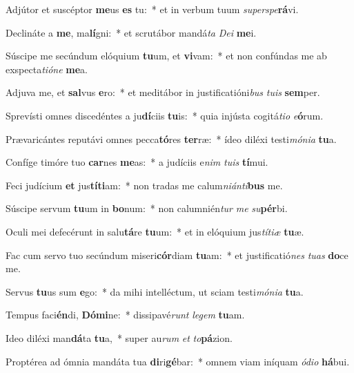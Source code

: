 \item Adjútor et suscéptor \textbf{me}us \textbf{es} tu:~* et in verbum tuum \textit{su}\textit{per}\textit{spe}\textbf{rá}vi.
\item Declináte a \textbf{me}, ma\textbf{lí}gni:~* et scrutábor mandá\textit{ta} \textit{De}\textit{i} \textbf{me}i.
\item Súscipe me secúndum elóquium \textbf{tu}um, et \textbf{vi}vam:~* et non confúndas me ab exspecta\textit{ti}\textit{ó}\textit{ne} \textbf{me}a.
\item Adjuva me, et \textbf{sal}vus \textbf{e}ro:~* et meditábor in justificatióni\textit{bus} \textit{tu}\textit{is} \textbf{sem}per.
\item Sprevísti omnes discedéntes a ju\textbf{dí}ciis \textbf{tu}is:~* quia injústa cogitá\textit{ti}\textit{o} \textit{e}\textbf{ó}rum.
\item Prævaricántes reputávi omnes pecca\textbf{tó}res \textbf{ter}ræ:~* ídeo diléxi testi\textit{mó}\textit{ni}\textit{a} \textbf{tu}a.
\item Confíge timóre tuo \textbf{car}nes \textbf{me}as:~* a judíciis e\textit{nim} \textit{tu}\textit{is} \textbf{tí}mui.
\item Feci judícium \textbf{et} jus\textbf{tí}\textbf{ti}am:~* non tradas me calum\textit{ni}\textit{án}\textit{ti}\textbf{bus} me.
\item Súscipe servum \textbf{tu}um in \textbf{bo}num:~* non calumnién\textit{tur} \textit{me} \textit{su}\textbf{pér}bi.
\item Oculi mei defecérunt in salu\textbf{tá}re \textbf{tu}um:~* et in elóquium jus\textit{tí}\textit{ti}\textit{æ} \textbf{tu}æ.
\item Fac cum servo tuo secúndum miseri\textbf{cór}diam \textbf{tu}am:~* et justificatió\textit{nes} \textit{tu}\textit{as} \textbf{do}ce me.
\item Servus \textbf{tu}us sum \textbf{e}go:~* da mihi intelléctum, ut sciam testi\textit{mó}\textit{ni}\textit{a} \textbf{tu}a.
\item Tempus faci\textbf{én}di, \textbf{Dó}\textbf{mi}ne:~* dissipavé\textit{runt} \textit{le}\textit{gem} \textbf{tu}am.
\item Ideo diléxi man\textbf{dá}ta \textbf{tu}a,~* super au\textit{rum} \textit{et} \textit{to}\textbf{pá}zion.
\item Proptérea ad ómnia mandáta tua \textbf{di}ri\textbf{gé}bar:~* omnem viam iníquam \textit{ó}\textit{di}\textit{o} \textbf{há}bui.
